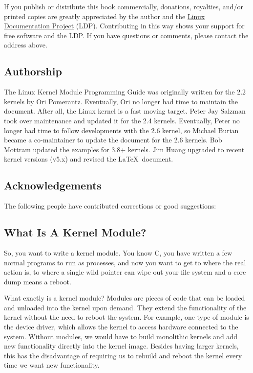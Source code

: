 \documentclass[10pt, oneside]{book}
\begin{document}
If you publish or distribute this book commercially, donations, royalties, and/or printed copies are greatly appreciated by the author and the \href{https://tldp.org/}{Linux Documentation Project} (LDP).
Contributing in this way shows your support for free software and the LDP. If you have questions or comments, please contact the address above.

\subsection{Authorship}
\label{sec:authorship}

The Linux Kernel Module Programming Guide was originally written for the 2.2 kernels by Ori Pomerantz.
Eventually, Ori no longer had time to maintain the document.
After all, the Linux kernel is a fast moving target.
Peter Jay Salzman took over maintenance and updated it for the 2.4 kernels.
Eventually, Peter no longer had time to follow developments with the 2.6 kernel, so Michael Burian became a co-maintainer to update the document for the 2.6 kernels.
Bob Mottram updated the examples for 3.8+ kernels.
Jim Huang upgraded to recent kernel versions (v5.x) and revised the \LaTeX\ document.

\subsection{Acknowledgements}
\label{sec:acknowledgements}

The following people have contributed corrections or good suggestions: 

\begin{flushleft}

\end{flushleft}

\subsection{What Is A Kernel Module?}
\label{sec:kernelmod}

So, you want to write a kernel module.
You know C, you have written a few normal programs to run as processes, and now you want to get to where the real action is, to where a single wild pointer can wipe out your file system and a core dump means a reboot.

What exactly is a kernel module?
Modules are pieces of code that can be loaded and unloaded into the kernel upon demand.
They extend the functionality of the kernel without the need to reboot the system.
For example, one type of module is the device driver, which allows the kernel to access hardware connected to the system.
Without modules, we would have to build monolithic kernels and add new functionality directly into the kernel image.
Besides having larger kernels, this has the disadvantage of requiring us to rebuild and reboot the kernel every time we want new functionality.
\end{document}
